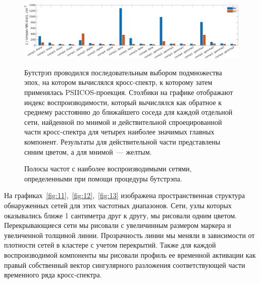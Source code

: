 \begin{figure}[h!tpb]
 \includegraphics[width=1\textwidth]{../images/psiicos_paper/Figure10_hr.jpg}
 \caption{Полосы частот с наиболее воспроизводимыми сетями, определенными при помощи
 процедуры бутстрэпа.}\label{fig:10}
 Бутстрэп проводился последовательным выбором подмножества эпох, на котором
 вычислялся кросс-спектр, к которому затем применялась PSIICOS-проекция.
 Столбики на графике отображают индекс воспроизводимости, который вычислялся
 как обратное к среднему расстоянию до ближайшего соседа для каждой отдельной
 сети, найденной по мнимой и действительной спроецированной части кросс-спектра для четырех
 наиболее значимых главных компонент. Результаты для действительной части представлены
 синим цветом, а для мнимой~--- желтым.
 \end{figure} %

 На графиках~\ref{fig:11},~\ref{fig:12},~\ref{fig:13} изображена пространственная
структура обнаруженных сетей для этих частотных диапазонов. Сети, узлы которых
оказывались ближе 1 сантиметра друг к другу, мы рисовали одним цветом. Перекрывающиеся сети
мы рисовали с увеличинным размером маркера и увеличенной толщиной линии. Прозрачность
линии мы меняли в зависимости от плотности сетей в кластере с учетом перекрытий.
Также для каждой воспроизводимой компоненты мы рисовали профиль ее временной активации
как правый собственный вектор сингулярного разложения соответствующей части временного
ряда кросс-спектра.


